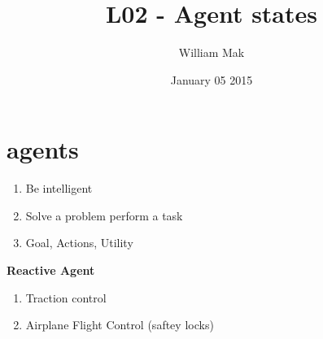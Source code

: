 \documentclass{article}
\title{L02 - Agent states}
\author{William Mak}
\date{January 05 2015}
\begin{document}
\maketitle
\section{agents}
\begin{enumerate}
	\item Be intelligent
	\item Solve a problem perform a task
	\item Goal, Actions, Utility
\end{enumerate}
\textbf{Reactive Agent}
\begin{enumerate}
	\item Traction control
	\item Airplane Flight Control (saftey locks)
\end{enumerate}
\end{document}

